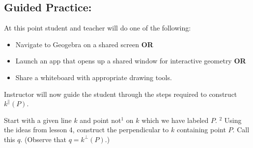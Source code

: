 \documentclass{tufte-handout}
\newcommand{\uv}{\vspace{.1in}}
\begin{document}
\begin{tcolorbox}[enhanced jigsaw,breakable,pad at break*=1mm,attach boxed title to top center={yshift=-3mm,yshifttext=-1mm},
  colback=yellow!50!white,colframe=yellow,colbacktitle=red!80!black,
  title=Lesson Design Specifications (Please Read),fonttitle=\bfseries,
  boxed title style={size=small,colframe=red!50!black} ]
  \section{Guided Practice: }
 At this point student and teacher will do one of the following: 
    \begin{itemize}
      \item Navigate to Geogebra on a shared screen \textbf{OR}
      \item Launch an app that opens up a shared window for interactive geometry \textbf{OR}
      \item Share a whiteboard with appropriate drawing tools.
  \end{itemize}
  
  Instructor will now guide the student through the steps required to construct $k^{\parallel}(P)$.
  
\uv
  
\begin{minipage}{0.65\textwidth}
\end{minipage} \hfill
\begin{minipage}{0.32\textwidth}
\begin{scriptsize}
Start with a given line $k$ and point not$^1$ on $k$  which we have labeled $P.$ $^2$ Using the ideas from lesson 4, construct the perpendicular to $k$ containing point $P$. Call this $q$. (Observe that $q=k^{\perp}(P).$)
\end{scriptsize} 
\end{minipage}


\end{tcolorbox}
\end{document}
